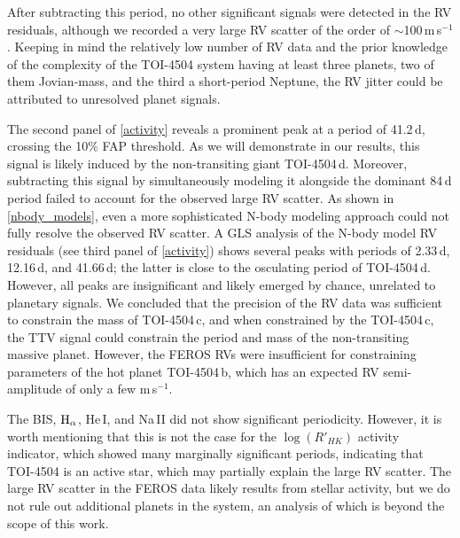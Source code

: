 \documentclass[twocolumn,twocolappendix]{aastex631}
\let\orgautoref\autoref
\renewcommand{\autoref}
        {\def\equationautorefname{Eq.}%
         \def\figureautorefname{Fig.}%
         \def\sectionautorefname{Sect.}%
         \def\subsectionautorefname{Sect.}%
         \def\subsubsectionautorefname{Sect.}%
         \orgautoref}
\begin{document}
After subtracting this period, no other significant signals were detected in the RV residuals, although we recorded a very large RV scatter of the order of $\sim$100\,m\,s$^{-1}$. Keeping in mind the relatively low number of RV data and the prior knowledge of the complexity of the TOI-4504 system having at least three planets, two of them Jovian-mass, and the third a short-period Neptune, the RV jitter could be attributed to unresolved planet signals.


The second panel of \autoref{activity} reveals a prominent peak at a period of 41.2\,d, crossing the 10\% FAP threshold. As we will demonstrate in our results, 
this signal is likely induced by the non-transiting giant TOI-4504\,d. Moreover, 
subtracting this signal by simultaneously modeling it alongside the dominant 84\,d 
period failed to account for the observed large RV scatter. As shown in 
\autoref{nbody_models}, even a more sophisticated N-body modeling approach could not fully resolve the observed RV scatter.
A GLS analysis of the N-body model RV residuals (see third panel of \autoref{activity}) shows several peaks with periods of 2.33\,d, 12.16\,d, and 41.66\,d; the latter is close to the osculating period of TOI-4504\,d. However, all peaks are insignificant and likely emerged by chance, unrelated to planetary signals.
We concluded that the precision of the RV data was sufficient to constrain the mass of TOI-4504\,c, and when constrained by the TOI-4504\,c, the TTV signal could constrain the period and mass of the non-transiting massive 
planet. However, the FEROS RVs were insufficient for constraining parameters of the hot planet TOI-4504\,b, which has an expected RV semi-amplitude of only a few m\,s$^{-1}$.

The BIS, $\rm{H}_{\alpha}$, He\,I, and Na\,II did not show significant periodicity. However, it is worth mentioning that this is not the case for the $\log(R'_{HK})$ activity indicator, which showed many marginally significant periods, indicating that TOI-4504 is an active star, which may partially explain the large RV scatter. The large RV scatter in the FEROS data likely results from stellar activity, but we do not rule out additional planets in the system, an analysis of which is beyond the scope of this work.
\end{document}
